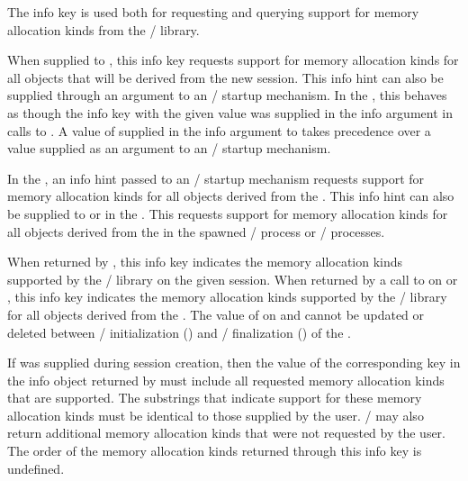 The  info key is used both for requesting
and querying support for memory allocation kinds from the \MPI/ library.

When supplied to , this info key requests support
for memory allocation kinds for all objects that will be derived from the new
session.
%
This info hint can also be supplied through an argument to an \MPI/ startup mechanism.
%
In the \spm{}, this behaves as though the 
info key with the given value was supplied in the info argument in calls to
.
%
A value of  supplied in the info argument to
 takes precedence over a value supplied as an
argument to an \MPI/ startup mechanism.

In the \wpm{}, an info hint passed to an \MPI/ startup mechanism requests support for memory allocation kinds
for all objects derived from the \wpm{}.
%
This info hint can also be supplied to  or
 in the \wpm{}. This
requests support for memory allocation kinds
for all objects derived from the \wpm{} in the spawned \MPI/ process or \MPI/
processes.

When returned by , this info key indicates the
memory allocation kinds supported by the \MPI/ library on the given session.
%
When returned by a call to  on
 or , this info key indicates the
memory allocation kinds supported by the \MPI/ library for all objects derived
from the \wpm{}.
The value of  on  and
 cannot be updated or deleted between \MPI/ initialization
() and \MPI/ finalization () of the \wpm{}.

If  was supplied during session creation,
then the value of the corresponding key in the info object returned by
 must include all requested memory
allocation kinds that are supported.
%
The substrings that indicate support for these memory allocation kinds must be
identical to those supplied by the user.
%
\MPI/ may also return additional memory allocation kinds that were not requested by the user.
%
The order of the memory allocation kinds returned through this info key is
undefined.

